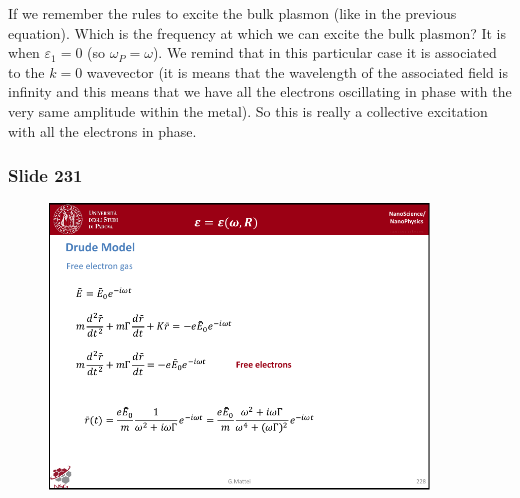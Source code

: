 \documentclass[../main/main.tex]{subfiles}
\begin{document}
If we remember the rules to excite the bulk plasmon (like in the previous equation). Which is the frequency at which we can excite the bulk plasmon? It is when \( \varepsilon _1 = 0 \) (so \( \omega _P = \omega  \)). We remind that in this particular case it is associated to the \( k=0 \) wavevector (it is means that the wavelength of the associated field is infinity and this means that we have all the electrons oscillating in phase with the very same amplitude within the metal). So this is really a collective excitation with all the electrons in phase.

\newpage

\subsubsection{Slide 231}

\begin{figure}[h!]
\centering
\includegraphics[page=4,width=0.9\textwidth]{../lessons/pdf_file/15_lesson.pdf}
\end{figure}
\end{document}
